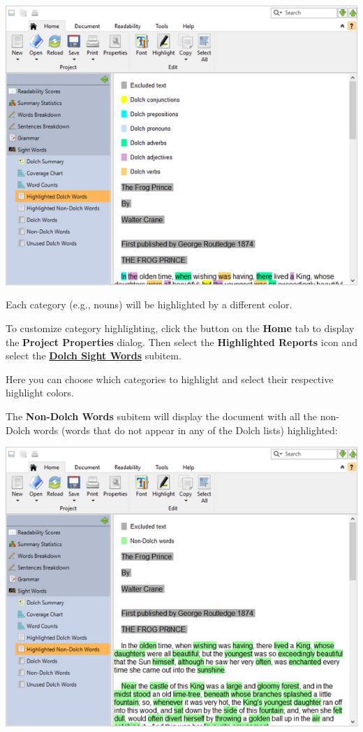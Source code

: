 \documentclass[
]{book}
\theoremstyle{definition}
\theoremstyle{definition}
\theoremstyle{definition}
\theoremstyle{definition}
\theoremstyle{remark}
\begin{document}
\includegraphics{Images/dolchhighlightedwords.png}

Each category (e.g., nouns) will be highlighted by a different color.

To customize category highlighting, click the  button on the \textbf{Home} tab to display the \textbf{Project Properties} dialog. Then select the \textbf{Highlighted Reports} icon and select the \protect\hyperlink{dolch-options}{\textbf{Dolch Sight Words}} subitem.


Here you can choose which categories to highlight and select their respective highlight colors.

The \textbf{Non-Dolch Words} subitem will display the document with all the non-Dolch words (words that do not appear in any of the Dolch lists) highlighted:

\includegraphics{Images/dolchhighlightednonwords.png}
\end{document}
